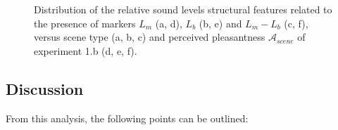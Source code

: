 \documentclass[preprint,12pt]{elsarticle}
\begin{document}
\begin{figure}[t]
        \caption{Distribution of the relative sound levels structural features related to the presence of markers $L_m$ (a, d), $L_b$ (b, e) and $L_m-L_b$ (c, f), versus scene type (a, b, c) and perceived pleasantness $\mathcal{A}_{scene}$ of experiment 1.b (d, e, f).}\label{fig:soundlevelMarker}
\end{figure}

\subsection{Discussion}

From this analysis, the following points can be outlined:
\end{document}
